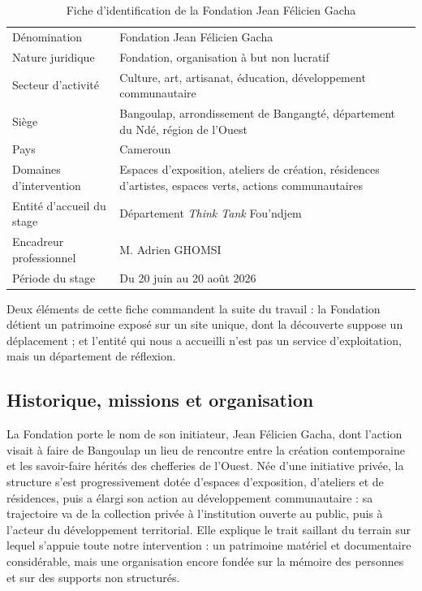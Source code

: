 \begin{table}[htbp]
\centering
\caption{Fiche d'identification de la Fondation Jean Félicien Gacha}
\label{tab:fiche}
\small
\begin{tabularx}{\textwidth}{|L{5.2cm}|X|}
\hline
{}
 &  \\ \hline
Dénomination & Fondation Jean Félicien Gacha \\ \hline
Nature juridique & Fondation, organisation à but non lucratif \\ \hline
Secteur d'activité & Culture, art, artisanat, éducation, développement communautaire \\ \hline
Siège & Bangoulap, arrondissement de Bangangté, département du Ndé, région de l'Ouest \\ \hline
Pays & Cameroun \\ \hline
Domaines d'intervention & Espaces d'exposition, ateliers de création, résidences d'artistes, espaces verts, actions communautaires \\ \hline
Entité d'accueil du stage & Département \emph{Think Tank} Fou'ndjem \\ \hline
Encadreur professionnel & M. Adrien GHOMSI \\ \hline
Période du stage & Du 20 juin au 20 août 2026 \\ \hline
\end{tabularx}
\end{table}

Deux éléments de cette fiche commandent la suite du travail : la Fondation
détient un patrimoine exposé sur un site unique, dont la découverte suppose un
déplacement ; et l'entité qui nous a accueilli n'est pas un service
d'exploitation, mais un département de réflexion.

\subsection{Historique, missions et organisation}

La Fondation porte le nom de son initiateur, Jean Félicien Gacha, dont l'action
visait à faire de Bangoulap un lieu de rencontre entre la création
contemporaine et les savoir-faire hérités des chefferies de l'Ouest. Née d'une
initiative privée, la structure s'est progressivement dotée d'espaces
d'exposition, d'ateliers et de résidences, puis a élargi son action au
développement communautaire : sa trajectoire va de la collection privée à
l'institution ouverte au public, puis à l'acteur du développement territorial.
Elle explique le trait saillant du terrain sur lequel s'appuie toute notre
intervention : un patrimoine matériel et documentaire considérable, mais une
organisation encore fondée sur la mémoire des personnes et sur des supports non
structurés.

